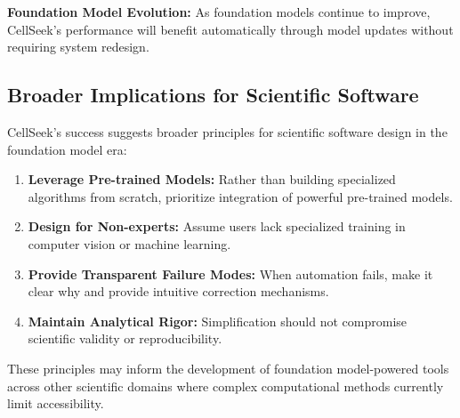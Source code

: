 \documentclass[../cellseek_paper.tex]{subfiles}
\begin{document}
\textbf{Foundation Model Evolution:} As foundation models continue to improve, CellSeek's performance will benefit automatically through model updates without requiring system redesign.

\subsection{Broader Implications for Scientific Software}

CellSeek's success suggests broader principles for scientific software design in the foundation model era:

\begin{enumerate}
  \item \textbf{Leverage Pre-trained Models:} Rather than building specialized algorithms from scratch, prioritize integration of powerful pre-trained models.
  \item \textbf{Design for Non-experts:} Assume users lack specialized training in computer vision or machine learning.
  \item \textbf{Provide Transparent Failure Modes:} When automation fails, make it clear why and provide intuitive correction mechanisms.
  \item \textbf{Maintain Analytical Rigor:} Simplification should not compromise scientific validity or reproducibility.
\end{enumerate}

These principles may inform the development of foundation model-powered tools across other scientific domains where complex computational methods currently limit accessibility.
\end{document}
